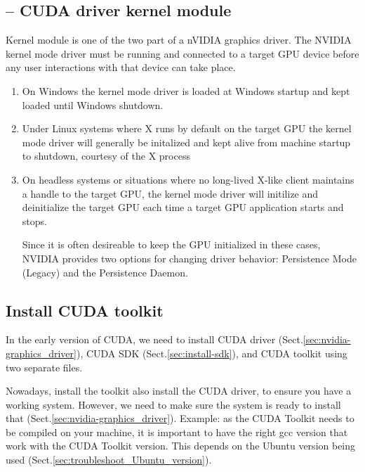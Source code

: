 \subsection{-- CUDA driver kernel module}
\label{sec:nvidia-driver-kernel-module}


Kernel module is one of the two part of a nVIDIA graphics driver.
The NVIDIA kernel mode driver must be running and connected to a target GPU
device before any user interactions with that device can take place.

\begin{enumerate}
  \item  On Windows the kernel mode driver is loaded at Windows startup and kept loaded until Windows shutdown.
  
  \item Under Linux systems where X runs by default on the target GPU the kernel mode driver will generally be initalized and kept alive from machine startup to shutdown, courtesy of the X process
  
  \item On headless systems or situations where no long-lived X-like client maintains a
handle to the target GPU, the kernel mode driver will initilize and deinitialize
the target GPU each time a target GPU application starts and stops.
  
  Since it is often desireable to keep the GPU initialized in these cases,
  NVIDIA provides two options for changing driver behavior: Persistence Mode
  (Legacy) and the Persistence Daemon.
  
\end{enumerate}



\subsection{Install CUDA toolkit}
\label{sec:install-toolkit}

In the early version of CUDA, we need to install CUDA driver
(Sect.\ref{sec:nvidia-graphics_driver}), CUDA SDK (Sect.\ref{sec:install-sdk}),
and CUDA toolkit using two separate files. 

Nowadays, install the toolkit also install the CUDA driver, to ensure you have a
working system. However, we need to make sure the system is ready to install
that (Sect.\ref{sec:nvidia-graphics_driver}). Example: as the CUDA Toolkit needs
to be compiled on your machine, it is important to have the right gcc version
that work with the CUDA Toolkit version. This depends on the Ubuntu version
being used (Sect.\ref{sec:troubleshoot_Ubuntu_version}).

